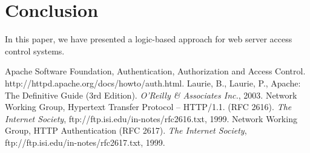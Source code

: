 \documentclass[11pt]{llncs}
\begin{document}
  \section{Conclusion}

    In this paper, we have presented a logic-based approach for web server
    access control systems.

  \begin{thebibliography}{5}
      Apache Software Foundation,
      Authentication, Authorization and Access Control.
      http://httpd.apache.org/docs/howto/auth.html.
      Laurie, B., Laurie, P.,
      Apache: The Definitive Guide (3rd Edition).
      {\em O'Reilly \& Associates Inc.}, 2003.
      Network Working Group,
      Hypertext Transfer Protocol -- HTTP/1.1. (RFC 2616).
      {\em The Internet Society},
      ftp://ftp.isi.edu/in-notes/rfc2616.txt, 1999.
      Network Working Group,
      HTTP Authentication (RFC 2617).
      {\em The Internet Society},
      ftp://ftp.isi.edu/in-notes/rfc2617.txt, 1999.
  \end{thebibliography}
\end{document}
